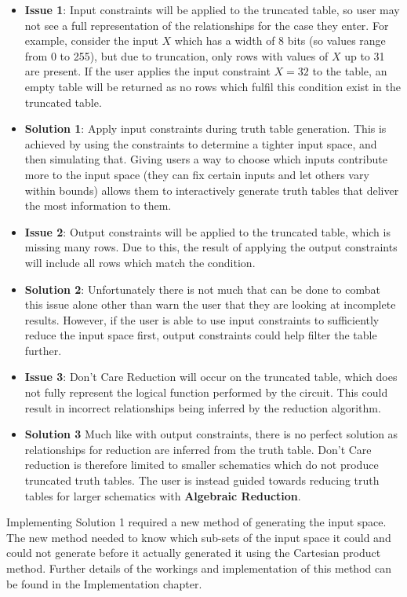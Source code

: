 \begin{itemize}
    \item[] \textbf{Issue 1}: Input constraints will be applied to the truncated table, so user may not see a full representation of the relationships for the case they enter. For example, consider the input $X$ which has a width of 8 bits (so values range from 0 to 255), but due to truncation, only rows with values of $X$ up to 31 are present. If the user applies the input constraint $X = 32$ to the table, an empty table will be returned as no rows which fulfil this condition exist in the truncated table.
    \item[] \textbf{Solution 1}: Apply input constraints during truth table generation. This is achieved by using the constraints to determine a tighter input space, and then simulating that. Giving users a way to choose which inputs contribute more to the input space (they can fix certain inputs and let others vary within bounds) allows them to interactively generate truth tables that deliver the most information to them.
    \item [] \textbf{Issue 2}: Output constraints will be applied to the truncated table, which is missing many rows. Due to this, the result of applying the output constraints will include all rows which match the condition.
    \item [] \textbf{Solution 2}: Unfortunately there is not much that can be done to combat this issue alone other than warn the user that they are looking at incomplete results. However, if the user is able to use input constraints to sufficiently reduce the input space first, output constraints could help filter the table further.
    \item [] \textbf{Issue 3}: Don't Care Reduction will occur on the truncated table, which does not fully represent the logical function performed by the circuit. This could result in incorrect relationships being inferred by the reduction algorithm.
    \item [] \textbf{Solution 3} Much like with output constraints, there is no perfect solution as relationships for reduction are inferred from the truth table. Don't Care reduction is therefore limited to smaller schematics which do not produce truncated truth tables. The user is instead guided towards reducing truth tables for larger schematics with \textbf{Algebraic Reduction}.
\end{itemize}

Implementing Solution 1 required a new method of generating the input space. The new method needed to know which sub-sets of the input space it could and could not generate before it actually generated it using the Cartesian product method. Further details of the workings and implementation of this method can be found in the Implementation chapter.

